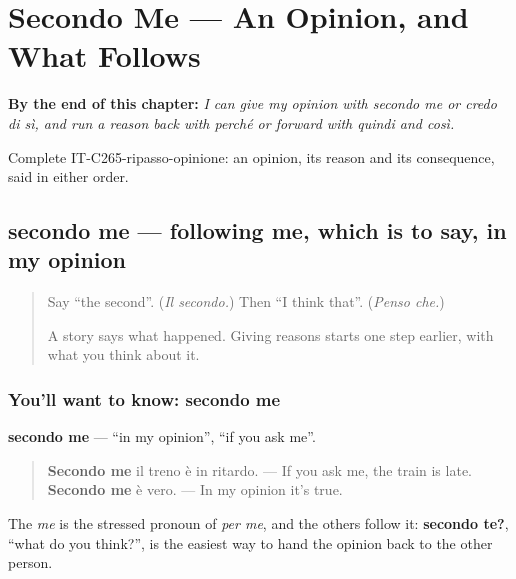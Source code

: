 
\chapter{Secondo Me --- An Opinion, and What Follows}
\label{ch:it-an-opinion-and-what-follows}

\begin{chapteropening}
\textbf{By the end of this chapter:} \emph{I can give my opinion with secondo me or credo di sì, and run a reason back with perché or forward with quindi and così.}

Complete IT-C265-ripasso-opinione: an opinion, its reason and its consequence, said in either order.
\end{chapteropening}

\section[secondo me]{secondo me — following me, which is to say, in my opinion}

\label{lesson:IT-C265-secondo-me}



\begin{quote}
Say \textquotedblleft{}the second\textquotedblright{}. (\emph{Il secondo.}) Then \textquotedblleft{}I think that\textquotedblright{}. (\emph{Penso che.})

A story says what happened. Giving reasons starts one step earlier, with what you think about it.
\end{quote}

\subsection*{You'll want to know: secondo me}
\textbf{secondo me} — \textquotedblleft{}in my opinion\textquotedblright{}, \textquotedblleft{}if you ask me\textquotedblright{}.

\begin{quote}
\textbf{Secondo me} il treno è in ritardo. — If you ask me, the train is late. \textbf{Secondo me} è vero. — In my opinion it's true.
\end{quote}

The \emph{me} is the stressed pronoun of \emph{per me}, and the others follow it: \textbf{secondo te?}, \textquotedblleft{}what do you think?\textquotedblright{}, is the easiest way to hand the opinion back to the other person.

